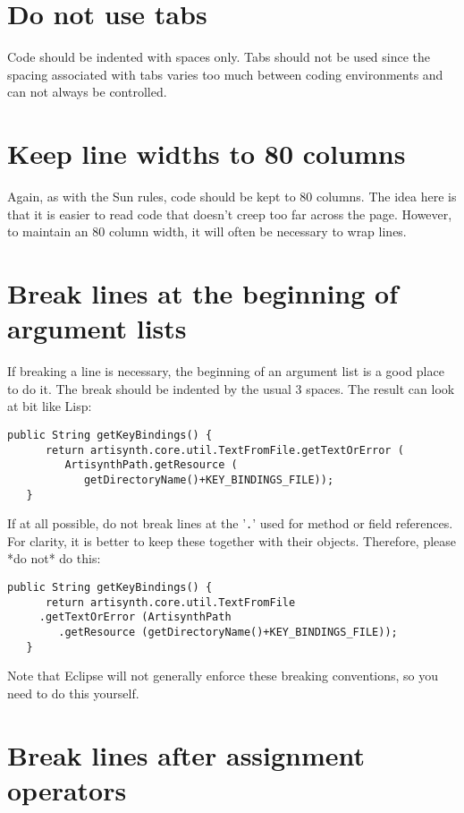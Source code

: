 \documentclass{article}
\begin{document}
\section{Do not use tabs}

Code should be indented with spaces only. Tabs should not be used
since the spacing associated with tabs varies too much between coding
environments and can not always be controlled.

\section{Keep line widths to 80 columns}

Again, as with the Sun rules, code should be kept to 80 columns.  The
idea here is that it is easier to read code that doesn't creep too far
across the page. However, to maintain an 80 column width, it will
often be necessary to wrap lines.

\section{Break lines at the beginning of argument lists}

If breaking a line is necessary, the beginning of an argument list is
a good place to do it. The break should be indented by the usual 3 spaces.
The result can look at bit like Lisp:
\begin{lstlisting}[]
   public String getKeyBindings() {
      return artisynth.core.util.TextFromFile.getTextOrError (
         ArtisynthPath.getResource (
            getDirectoryName()+KEY_BINDINGS_FILE));
   }
\end{lstlisting}

If at all possible, do not break lines at the '{\tt .}' used for method or
field references. For clarity, it is better to keep these together with 
their objects. Therefore, please *do not* do this:
\begin{lstlisting}[]
   public String getKeyBindings() {
      return artisynth.core.util.TextFromFile
	 .getTextOrError (ArtisynthPath
	    .getResource (getDirectoryName()+KEY_BINDINGS_FILE));
   }
\end{lstlisting}

Note that Eclipse will not generally enforce these breaking
conventions, so you need to do this yourself.

\section{Break lines after assignment operators}
\end{document}
